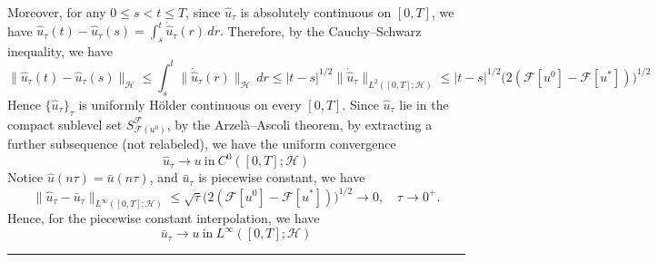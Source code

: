 \documentclass[twoside,11pt]{article}
\newcommand{\BlackBoxProof}{\rule{1.5ex}{1.5ex}}
\renewenvironment{proof}{\par\noindent{\bf Proof\ }}{\hfill\BlackBoxProof\par\medskip}
\newcommand{\calF}{\mathcal{F}}
\newcommand{\calH}{\mathcal{H}}
\begin{document}
\begin{proof}
Moreover, for any $0\le s<t\le T$, since $\hat u_\tau$ is absolutely continuous on $[0,T]$, we have
\(
\hat u_\tau(t)-\hat u_\tau(s)=\int_s^t \dot{\hat u}_\tau(r)\,dr.
\)
Therefore, by the Cauchy--Schwarz inequality, we have
\[
\|\hat u_\tau(t)-\hat u_\tau(s)\|_{\mathcal H}
\le \int_s^t \|\dot{\hat u}_\tau(r)\|_{\mathcal H}\,dr
\le |t-s|^{1/2}\|\dot{\hat u}_\tau\|_{L^2([0,T];\mathcal H)} \le |t-s|^{1/2} \bigl(2(\mathcal F[u^0]-\calF[u^*])\bigr)^{1/2}
\]
Hence $\{\hat u_\tau\}_\tau$ is uniformly H\"older continuous on every $[0,T]$. Since $\hat{u}_{\tau}$ lie in the compact sublevel set $S_{\mathcal{F}(u^0)}^\calF$, by the Arzel\`a--Ascoli theorem, by extracting a further subsequence (not relabeled), we have the uniform convergence
\begin{equation}
 \hat{u}_{\tau} \rightarrow u ~\text{in}~ C^0([0, T]; \mathcal{H}) 
\end{equation}
Notice $\hat{u} (n \tau) = \bar{u} (n \tau)$, and $\bar{u}_{\tau}$ is piecewise constant, we have
\begin{equation}
 \| \hat{u}_{\tau} - \bar{u}_{\tau} \|_{L^{\infty} ([0, T]; \calH)} \leq \sqrt{\tau} \bigl(2(\mathcal F[u^0]-\calF[u^*])\bigr)^{1/2} \rightarrow 0, \quad \tau \rightarrow 0^+.
\end{equation}
Hence, for the piecewise constant interpolation, we have
\begin{equation}
  \bar{u}_{\tau} \rightarrow u ~\text{in}~ L^{\infty} ([0, T]; \mathcal{H})
\end{equation}


\end{proof}
\end{document}

